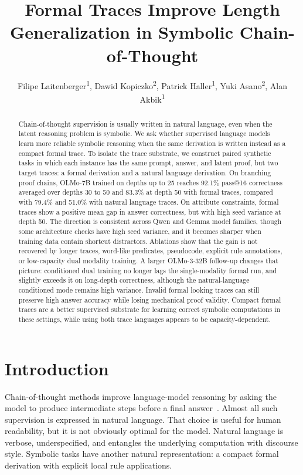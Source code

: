 \documentclass[11pt]{article}
\title{Formal Traces Improve Length Generalization in Symbolic Chain-of-Thought}
\author{
  Filipe Laitenberger\textsuperscript{1}, Dawid Kopiczko\textsuperscript{2}, Patrick Haller\textsuperscript{1}, Yuki Asano\textsuperscript{2}, Alan Akbik\textsuperscript{1}
}
\makeatletter
\newcommand{\passsixteen}{pass@16}
\makeatother
\begin{document}
\maketitle

\begin{abstract}
Chain-of-thought supervision is usually written in natural language, even when
the latent reasoning problem is symbolic. We ask whether supervised language
models learn more reliable symbolic reasoning when the same derivation is
written instead as a compact formal trace. To isolate the trace substrate, we
construct paired synthetic tasks in which each instance has the same prompt,
answer, and latent proof, but two target traces: a formal derivation and a
natural language derivation. On branching proof chains, OLMo-7B trained on
depths up to 25 reaches 92.1\% \passsixteen{} correctness averaged over depths
30 to 50 and 83.3\% at depth 50 with formal traces, compared with 79.4\% and
51.0\% with natural language traces. On attribute constraints, formal traces
show a positive mean gap in answer correctness, but with high seed variance at
depth 50.
The direction is consistent across Qwen and Gemma model families, though some
architecture checks have high seed variance, and it becomes sharper when
training data contain shortcut distractors. Ablations show that the gain is not
recovered by longer traces, word-like predicates, pseudocode, explicit rule
annotations, or low-capacity dual modality training. A larger OLMo-3-32B
follow-up changes that picture: conditioned dual training no longer lags the
single-modality formal run, and slightly exceeds it on long-depth correctness,
although the natural-language conditioned mode remains high variance.
Invalid formal looking traces can still preserve high answer accuracy while
losing mechanical proof validity. Compact formal traces are a better supervised
substrate for learning correct symbolic computations in these settings, while
using both trace languages appears to be capacity-dependent.
\end{abstract}

\section{Introduction}

Chain-of-thought methods improve language-model reasoning by asking the model to
produce intermediate steps before a final answer~\citep{wei2022chain,
kojima2022large}. Almost all such supervision is expressed in natural language.
That choice is useful for human readability, but it is not obviously optimal for
the model. Natural language is verbose, underspecified, and entangles the
underlying computation with discourse style. Symbolic tasks have another
natural representation: a compact formal derivation with explicit local rule
applications.
\end{document}
